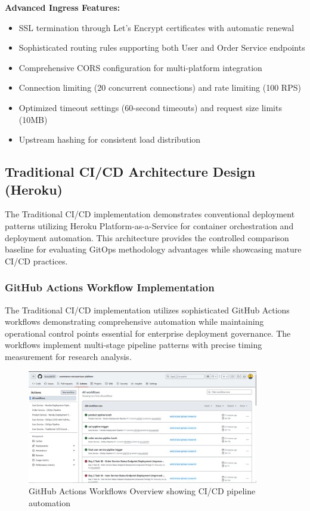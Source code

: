 \textbf{Advanced Ingress Features:}
\begin{itemize}
\item SSL termination through Let's Encrypt certificates with automatic renewal
\item Sophisticated routing rules supporting both User and Order Service endpoints
\item Comprehensive CORS configuration for multi-platform integration
\item Connection limiting (20 concurrent connections) and rate limiting (100 RPS)
\item Optimized timeout settings (60-second timeouts) and request size limits (10MB)
\item Upstream hashing for consistent load distribution
\end{itemize}

\subsection{Traditional CI/CD Architecture Design (Heroku)}

The Traditional CI/CD implementation demonstrates conventional deployment patterns utilizing Heroku Platform-as-a-Service for container orchestration and deployment automation. This architecture provides the controlled comparison baseline for evaluating GitOps methodology advantages while showcasing mature CI/CD practices.

\subsubsection{GitHub Actions Workflow Implementation}

The Traditional CI/CD implementation utilizes sophisticated GitHub Actions workflows demonstrating comprehensive automation while maintaining operational control points essential for enterprise deployment governance. The workflows implement multi-stage pipeline patterns with precise timing measurement for research analysis.

\begin{figure}[H]
\centering
\includegraphics[width=0.9\textwidth]{figures/chapter4/github-actions-workflows-overview.png}
\caption{GitHub Actions Workflows Overview showing CI/CD pipeline automation}
\label{fig:github-actions-workflows-overview}
\end{figure}

